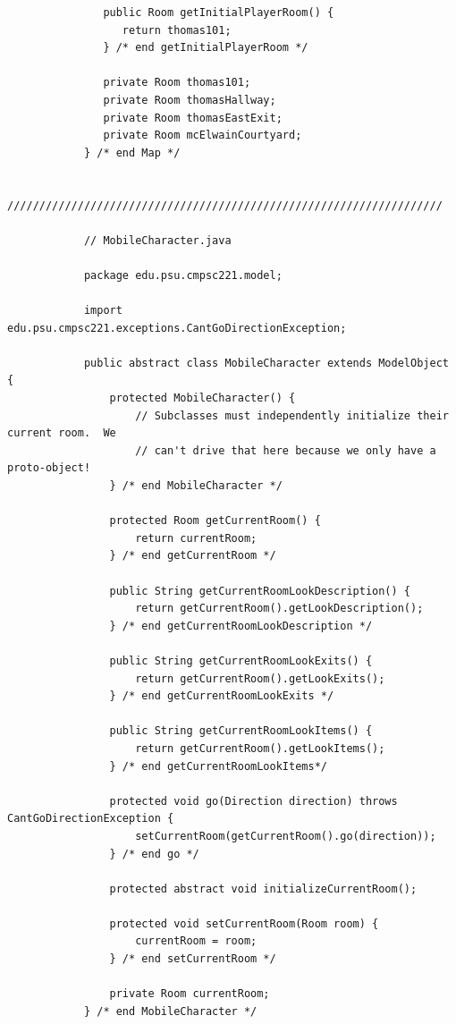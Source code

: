 \documentclass[a4paper, 11pt]{article}
\begin{document}
\begin{lstlisting}
               public Room getInitialPlayerRoom() {
                  return thomas101;
               } /* end getInitialPlayerRoom */

               private Room thomas101;
               private Room thomasHallway;
               private Room thomasEastExit;
               private Room mcElwainCourtyard;
            } /* end Map */

            ////////////////////////////////////////////////////////////////////

            // MobileCharacter.java

            package edu.psu.cmpsc221.model;

            import edu.psu.cmpsc221.exceptions.CantGoDirectionException;

            public abstract class MobileCharacter extends ModelObject {
                protected MobileCharacter() {
                    // Subclasses must independently initialize their current room.  We
                    // can't drive that here because we only have a proto-object!
                } /* end MobileCharacter */

                protected Room getCurrentRoom() {
                    return currentRoom;
                } /* end getCurrentRoom */

                public String getCurrentRoomLookDescription() {
                    return getCurrentRoom().getLookDescription();
                } /* end getCurrentRoomLookDescription */

                public String getCurrentRoomLookExits() {
                    return getCurrentRoom().getLookExits();
                } /* end getCurrentRoomLookExits */

                public String getCurrentRoomLookItems() {
                    return getCurrentRoom().getLookItems();
                } /* end getCurrentRoomLookItems*/

                protected void go(Direction direction) throws CantGoDirectionException {
                    setCurrentRoom(getCurrentRoom().go(direction));
                } /* end go */

                protected abstract void initializeCurrentRoom();

                protected void setCurrentRoom(Room room) {
                    currentRoom = room;
                } /* end setCurrentRoom */

                private Room currentRoom;
            } /* end MobileCharacter */


\end{lstlisting}
\end{document}
